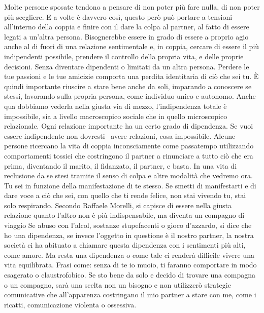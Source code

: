 \documentclass[12pt]{book} %
\begin{document}
Molte persone sposate tendono a pensare di non poter più fare nulla, di non poter più scegliere. E a volte è davvero
così, questo però può portare a tensioni all'interno della coppia e finire con il dare la colpa al
partner, al fatto di essere legati a un'altra persona. Bisognerebbe essere in grado di essere a proprio agio anche al
di fuori di una relazione sentimentale e, in coppia, cercare di essere il più indipendenti possibile, prendere il
controllo della propria vita, e delle proprie decisioni. Senza diventare dipendenti o limitati da un altra persona.
Perdere le tue passioni e le tue amicizie comporta una perdita identitaria di ciò che sei
tu. È quindi importante riuscire a
stare bene anche da soli, imparando a conoscere se stessi, lavorando sulla propria persona, come individuo unico e
autonomo. Anche qua dobbiamo vederla nella giusta via di mezzo, l'indipendenza totale è
impossibile, sia a livello macroscopico sociale che in quello microscopico relazionale. Ogni relazione importante ha un
certo grado di dipendenza. Se vuoi essere indipendente non dovresti \ avere relazioni, cosa impossibile. Alcune persone
ricercano la vita di coppia inconsciamente come passatempo utilizzando comportamenti tossici che costringono il partner
a rinunciare a tutto ciò che era prima, diventando il marito, il fidanzato, il partner, e basta. In una vita di
reclusione da se stesi tramite il senso di colpa e altre modalità che vedremo ora. Tu sei in funzione della
manifestazione di te stesso. Se smetti di manifestarti e di dare voce a ciò che sei, con quello che ti rende felice,
non stai vivendo tu, stai solo respirando. Secondo Raffaele Morelli, si capisce di essere nella giusta relazione quanto
l'altro non è più indispensabile, ma diventa un compagno di
viaggio Se abuso con l'alcol, sostanze stupefacenti o
gioco d'azzardo, si dice che ho una dipendenza, se invece l'oggetto in
questione è il nostro partner, la nostra società ci ha abituato a chiamare questa dipendenza con i sentimenti più alti,
come amore. Ma resta una dipendenza o come tale ci renderà difficile vivere una vita equilibrata. Frasi come: senza di
te io muoio, ti faranno comportare in modo esagerato o claustrofobico. Se sto bene da solo e decido di trovare una
compagna o un compagno, sarà una scelta non un bisogno e non utilizzerò strategie comunicative che
all'apparenza costringano il mio partner a stare con me, come i ricatti, comunicazione violenta o
ossessiva.
\end{document}
